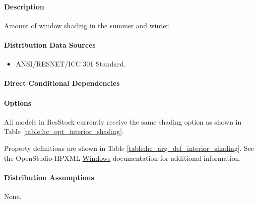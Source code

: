 \paragraph{Description}
% 
Amount of window shading in the summer and winter.

\paragraph{Distribution Data Sources}
% 
\begin{itemize}

\item
  ANSI/RESNET/ICC 301 Standard.
\end{itemize}

\paragraph{Direct Conditional Dependencies}


\paragraph{Options}
All models in ResStock currently receive the same shading option as shown in Table \ref{table:hc_opt_interior_shading}.



Property definitions are shown in Table \ref{table:hc_arg_def_interior_shading}. See the OpenStudio-HPXML \href{https://openstudio-hpxml.readthedocs.io/en/v1.10.0/workflow_inputs.html#hpxml-windows}{Windows} documentation for additional information.



\paragraph{Distribution Assumptions}
% 
None.
